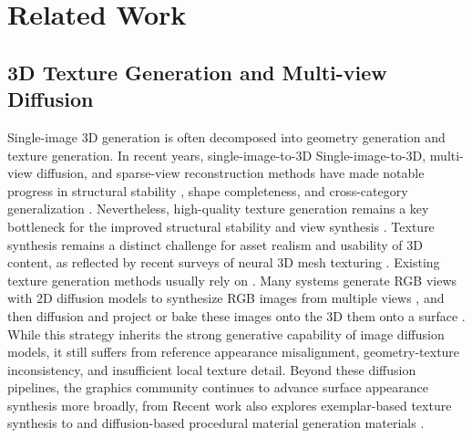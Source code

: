\documentclass[times,twocolumn,final]{elsarticle}
\providecommand{\DIFadd}[1]{{\protect\color{blue} \sf #1}} %
\providecommand{\DIFdel}[1]{{\protect\color{red} \scriptsize #1}} %
\providecommand{\DIFaddbegin}{} %
\providecommand{\DIFaddend}{} %
\providecommand{\DIFdelbegin}{} %
\providecommand{\DIFdelend}{} %
\begin{document}
\section{Related Work}
\label{sec:related}

\subsection{3D Texture Generation and Multi-view Diffusion}
\label{subsec:3dtex}

Single-image 3D generation is often decomposed into geometry generation and texture generation. \DIFdelbegin \DIFdel{In recent years, single-image-to-3D}\DIFdelend \DIFaddbegin \DIFadd{Single-image-to-3D}\DIFaddend , multi-view diffusion, and sparse-view reconstruction methods have \DIFdelbegin \DIFdel{made notable progress in structural stability , shape completeness, and cross-category generalization \cite{liu2023zero1to3,shi2023zero123pp,liu2023syncdreamer,long2023wonder3d,shi2024mvdream,wang2023imagedream,xu2024instantmesh,ke2024era3d}. Nevertheless, high-quality texture generation remains a key bottleneck for the }\DIFdelend \DIFaddbegin \DIFadd{improved structural stability and view synthesis \cite{liu2023zero1to3,shi2023zero123pp,liu2023syncdreamer,long2023wonder3d,shi2024mvdream,wang2023imagedream,xu2024instantmesh,ke2024era3d}. Texture synthesis remains a distinct challenge for asset }\DIFaddend realism and usability \DIFdelbegin \DIFdel{of 3D content, as reflected by recent surveys of neural 3D mesh texturing \cite{perla2026survey}. Existing texture generation methods usually rely on }\DIFdelend \DIFaddbegin \DIFadd{\cite{perla2026survey}. Many systems generate RGB views with }\DIFaddend 2D \DIFdelbegin \DIFdel{diffusion models to synthesize RGB images from multiple views , and then }\DIFdelend \DIFaddbegin \DIFadd{diffusion and }\DIFaddend project or bake \DIFdelbegin \DIFdel{these images onto the 3D }\DIFdelend \DIFaddbegin \DIFadd{them onto a }\DIFaddend surface \cite{chen2023text2tex,richardson2023texture,poole2023dreamfusion,chen2023fantasia3d}. \DIFdelbegin \DIFdel{While this strategy inherits the strong generative capability of image diffusion models, it still suffers from reference appearance misalignment, geometry-texture inconsistency, and insufficient local texture detail. Beyond these diffusion pipelines, the graphics community continues to advance surface appearance synthesis more broadly, from }\DIFdelend \DIFaddbegin \DIFadd{Recent work also explores }\DIFaddend exemplar-based texture synthesis \DIFdelbegin \DIFdel{\cite{guzman2026adaptive} to }\DIFdelend \DIFaddbegin \DIFadd{and }\DIFaddend diffusion-based procedural \DIFdelbegin \DIFdel{material generation \cite{lv2025interpretable}}\DIFdelend \DIFaddbegin \DIFadd{materials \cite{guzman2026adaptive,lv2025interpretable}}\DIFaddend .
\end{document}
